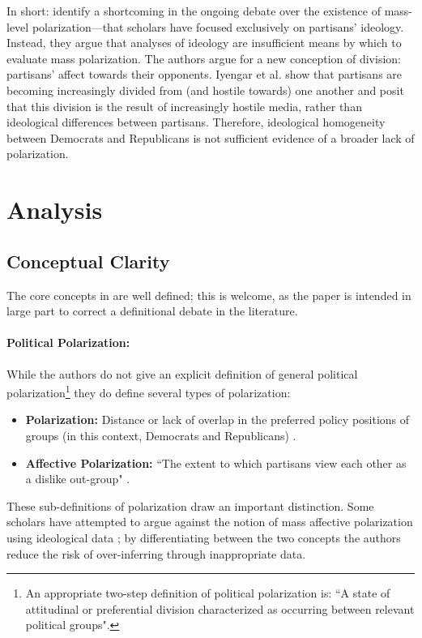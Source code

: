 \documentclass[12pt]{article}
\begin{document}
In short: \citeauthor{iyengar2012affect} identify a shortcoming in the ongoing debate over the existence of mass-level polarization---that scholars have focused exclusively on partisans' ideology. Instead, they argue that analyses of ideology are insufficient means by which to evaluate mass polarization. The authors argue for a new conception of division: partisans' affect towards their opponents. Iyengar et al. show that partisans are becoming increasingly divided from (and hostile towards) one another and posit that this division is the result of increasingly hostile media, rather than ideological differences between partisans. Therefore, ideological homogeneity between Democrats and Republicans is not sufficient evidence of a broader lack of polarization.




\section{Analysis}
\subsection{Conceptual Clarity}
The core concepts in \citep{iyengar2012affect} are well defined; this is welcome, as the paper is intended in large part to correct a definitional debate in the literature. 

\paragraph{Political Polarization:} 
While the authors do not give an explicit definition of general political polarization\footnote{An appropriate two-step definition of political polarization is: ``A state of attitudinal or preferential division characterized as occurring between relevant political groups".} they do define several types of polarization:
\begin{itemize}
\item\textbf{Polarization:} Distance or lack of overlap in the preferred policy positions of groups (in this context, Democrats and Republicans) \citep[p. 405]{iyengar2012affect}.
\item\textbf{Affective Polarization:} ``The extent to which partisans view each other as a dislike out-group" \citep[p. 406]{iyengar2012affect}.
\end{itemize}
These sub-definitions of polarization draw an important distinction. Some scholars have attempted to argue against the notion of mass affective polarization using ideological data \citep{fiorina2005culture}; by differentiating between the two concepts the authors reduce the risk of over-inferring through inappropriate data.
\end{document}
